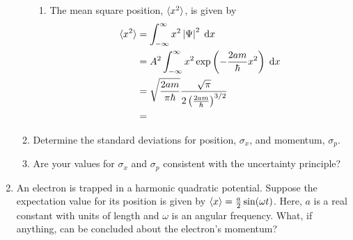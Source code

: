 \documentclass[a4paper, 12pt]{config/homework}
\begin{document}
\begin{enumerate}
\begin{enumerate}[label = (\alph*)]
\begin{enumerate}[label=\roman*.]
\item The mean square position, \(\braket{x^2}\), is given by
\begin{align*}
\braket{x^2} &= \bint{-\infty}{\infty}{x^2 \left|\Psi\right|^2}{x}
\\&= A^2 \bint{-\infty}{\infty}{x^2 \exp\left(- \frac{2am}{\hbar} x^2\right)}{x}
\\&= \sqrt{\frac{2am}{\pi\hbar}} \frac{\sqrt{\pi}}{2\left(\frac{2am}{\hbar}\right)^{3/2}}
\\&=
\end{align*}

\end{enumerate}

\item Determine the standard deviations for position, \(\sigma_x\), and momentum, \(\sigma_p\).
\item Are your values for \(\sigma_x\) and \(\sigma_p\) consistent with the uncertainty principle?
\end{enumerate}

\pagebreak
\item An electron is trapped in a harmonic quadratic potential. Suppose the expectation value for its position is given by \(\braket{x} = \frac{a}{2}\sin(\omega t)\). Here, \(a\) is a real constant with units of length and \(\omega \) is an angular frequency. What, if anything, can be concluded about the electron's momentum?
\end{enumerate}
\end{document}
